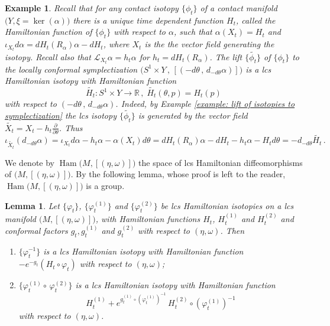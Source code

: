 \documentclass{amsart}
\DeclareMathOperator{\Ham}{Ham}
\newtheorem{lemma}[thm]{Lemma}
\newtheorem{example}[thm]{Example}
\theoremstyle{remark}
\begin{document}
\begin{example}\label{Example:Lift of contact Hamiltonians}
Recall that for any contact isotopy $\{\phi_t\}$
of a contact manifold $\big(Y, \xi = \ker (\alpha)\big)$
there is a unique time dependent function $H_t$,
called the Hamiltonian function of $\{\phi_t\}$
with respect to $\alpha$,
such that $\alpha(X_t) = H_t$
and $\iota_{X_t} d\alpha = dH_t (R_{\alpha}) \alpha - dH_t$, where $X_t$ is the the vector field generating the isotopy.
Recall also that $\mathcal{L}_{X_t}\alpha = h_t \alpha$
for $h_t = dH_t (R_{\alpha})$.
The lift $\{\widetilde{\phi_t}\}$ of $\{\phi_t\}$
to the locally conformal symplectization
$\big( S^1 \times Y \,,\, [(-d\theta \,,\, d_{-d\theta}\alpha )]\big)$
is a lcs Hamiltonian isotopy
with Hamiltonian function
\[
\widetilde{H_t}: S^1 \times Y \rightarrow \mathbb{R} \,,\;
\widetilde{H_t} (\theta, p) = H_t (p)
\]
with respect to $(-d\theta \,,\, d_{-d\theta}\alpha)$.
Indeed,
by Example \ref{example: lift of isotopies to symplectization}
the lcs isotopy $\{\widetilde{\phi_t}\}$ is generated by the vector field
$\widetilde{X_t} = X_t - h_t \frac{\partial}{\partial \theta}$.
Thus
\[
\iota_{\widetilde{X_t}} (d_{-d\theta}\alpha)
= \iota_{X_t}d\alpha - h_t\alpha - \alpha(X_t)d\theta
= dH_t (R_{\alpha}) \alpha - dH_t - h_t\alpha - H_t d\theta
= - d_{-d\theta} \widetilde{H_t} \,.
\]
\end{example}

We denote by $\Ham \big(M, [(\eta, \omega)]\big)$
the space of lcs Hamiltonian diffeomorphisms
of $\big(M, [(\eta, \omega)]\big)$.
By the following lemma, whose proof is left to the reader,
$\Ham \big(M, [(\eta, \omega)]\big)$ is a group.

\begin{lemma}\label{lemma: composition law Hamiltonians}
Let $\{\varphi_t\}$, $\{\varphi_t^{(1)}\}$ and $\{\varphi_t^{(2)}\}$
be lcs Hamiltonian isotopies on a lcs manifold
$\big( M , [(\eta, \omega)]\big)$,
with Hamiltonian functions $H_t$, $H_t^{(1)}$ and $H_t^{(2)}$
and conformal factors $g_t, g_t^{(1)}$ and $g_t^{(2)}$
with respect to $(\eta, \omega)$.
Then
\renewcommand{\theenumi}{\roman{enumi}}
\begin{enumerate}
\item $\{\varphi_t^{-1}\}$ is a lcs Hamiltonian isotopy
with Hamiltonian function $- e^{-g_t} (H_t \circ \varphi_t)$
with respect to $(\eta, \omega)$;
\item $\{ \varphi_t^{(1)} \circ \, \varphi_t^{(2)} \}$
is a lcs Hamiltonian isotopy
with Hamiltonian function
$$
H_t^{(1)} + e^{g_t^{(1)} \circ (\varphi_t^{(1)})^{-1}} \,
H_t^{(2)} \circ (\varphi_t^{(1)})^{-1}
$$
with respect to $(\eta, \omega)$.
\end{enumerate}
\end{lemma}
\end{document}
